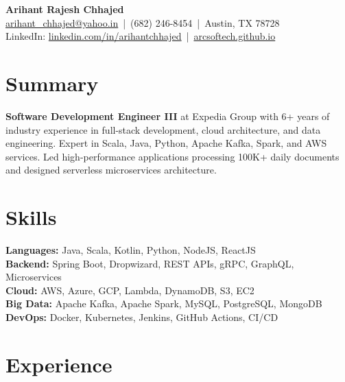 \documentclass[a4paper,10pt]{article}
\begin{document}
\begin{center}
    {\LARGE \textbf{Arihant Rajesh Chhajed}} \\[0.2cm]
    \href{mailto:arihant_chhajed@yahoo.in}{arihant\_chhajed@yahoo.in} \,|\, (682) 246-8454 \,|\, Austin, TX 78728 \\
    LinkedIn: \href{https://linkedin.com/in/arihantchhajed}{linkedin.com/in/arihantchhajed} \,|\, \href{https://arcsoftech.github.io}{arcsoftech.github.io}
\end{center}

\vspace{0.2cm}

\section*{Summary}
\textbf{Software Development Engineer III} at Expedia Group with 6+ years of industry experience in full-stack development, cloud architecture, and data engineering. Expert in Scala, Java, Python, Apache Kafka, Spark, and AWS services. Led high-performance applications processing 100K+ daily documents and designed serverless microservices architecture.

\vspace{0.1cm}

\section*{Skills}
\noindent
\textbf{Languages:} Java, Scala, Kotlin, Python, NodeJS, ReactJS \\
\textbf{Backend:} Spring Boot, Dropwizard, REST APIs, gRPC, GraphQL, Microservices \\
\textbf{Cloud:} AWS, Azure, GCP, Lambda, DynamoDB, S3, EC2 \\
\textbf{Big Data:} Apache Kafka, Apache Spark, MySQL, PostgreSQL, MongoDB \\
\textbf{DevOps:} Docker, Kubernetes, Jenkins, GitHub Actions, CI/CD

\vspace{0.1cm}

\section*{Experience}
\end{document}
